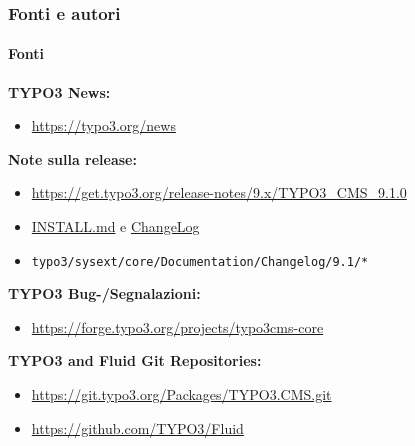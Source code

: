 \begin{frame}[fragile]
	\frametitle{Fonti e autori}
	\framesubtitle{Fonti}

	\textbf{TYPO3 News:}
		\begin{itemize}\smaller
			\item \url{https://typo3.org/news}
		\end{itemize}

	\textbf{Note sulla release:}
		\begin{itemize}\smaller
			\item \url{https://get.typo3.org/release-notes/9.x/TYPO3_CMS_9.1.0}
			\item \href{https://github.com/TYPO3/TYPO3.CMS/blob/master/INSTALL.md}{INSTALL.md}
				e \href{https://github.com/TYPO3/TYPO3.CMS/tree/master/typo3/sysext/core/Documentation/Changelog}{ChangeLog}
			\item \texttt{typo3/sysext/core/Documentation/Changelog/9.1/*}
		\end{itemize}

	\textbf{TYPO3 Bug-/Segnalazioni:}
		\begin{itemize}\smaller
			\item \url{https://forge.typo3.org/projects/typo3cms-core}
		\end{itemize}

	\textbf{TYPO3 and Fluid Git Repositories:}
		\begin{itemize}\smaller
			\item \url{https://git.typo3.org/Packages/TYPO3.CMS.git}
			\item \url{https://github.com/TYPO3/Fluid}
		\end{itemize}

\end{frame}


